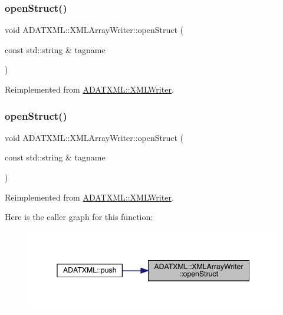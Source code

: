 \subsubsection{\texorpdfstring{openStruct()}{openStruct()}\hspace{0.1cm}{\footnotesize\ttfamily [1/3]}}
{\footnotesize\ttfamily void A\+D\+A\+T\+X\+M\+L\+::\+X\+M\+L\+Array\+Writer\+::open\+Struct (\begin{DoxyParamCaption}\item[{const std\+::string \&}]{tagname }\end{DoxyParamCaption})\hspace{0.3cm}{\ttfamily [virtual]}}



Reimplemented from \mbox{\hyperlink{classADATXML_1_1XMLWriter_a8f9728743acfd9c15ab5d69bf8800a5e}{A\+D\+A\+T\+X\+M\+L\+::\+X\+M\+L\+Writer}}.

\mbox{\label{classADATXML_1_1XMLArrayWriter_af1602cb14d54aa8e42442f2784c00e22}} 
\subsubsection{\texorpdfstring{openStruct()}{openStruct()}\hspace{0.1cm}{\footnotesize\ttfamily [2/3]}}
{\footnotesize\ttfamily void A\+D\+A\+T\+X\+M\+L\+::\+X\+M\+L\+Array\+Writer\+::open\+Struct (\begin{DoxyParamCaption}\item[{const std\+::string \&}]{tagname }\end{DoxyParamCaption})\hspace{0.3cm}{\ttfamily [virtual]}}



Reimplemented from \mbox{\hyperlink{classADATXML_1_1XMLWriter_a8f9728743acfd9c15ab5d69bf8800a5e}{A\+D\+A\+T\+X\+M\+L\+::\+X\+M\+L\+Writer}}.

Here is the caller graph for this function\+:
\nopagebreak
\begin{figure}[H]
\begin{center}
\leavevmode
\includegraphics[width=345pt]{dc/df3/classADATXML_1_1XMLArrayWriter_af1602cb14d54aa8e42442f2784c00e22_icgraph}
\end{center}
\end{figure}
\mbox{\label{classADATXML_1_1XMLArrayWriter_af1602cb14d54aa8e42442f2784c00e22}} 
